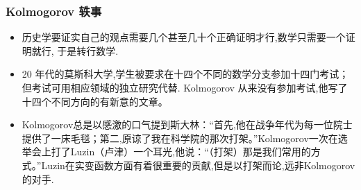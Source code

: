 \begin{frame}
  \frametitle{{\rm Kolmogorov} 轶事}
  \begin{itemize}[<+-|alert@+>]
  \item  历史学要证实自己的观点需要几个甚至几十个正确证明才行,数学只需要一个证明就行, 于是转行数学.
  \item 20 年代的莫斯科大学,学生被要求在十四个不同的数学分支参加十四门考试；但考试可用相应领域的独立研究代替. {\rm Kolmogorov} 从来没有参加考试,他写了十四个不同方向的有新意的文章。
  \item {\rm Kolmogorov}总是以感激的口气提到斯大林：“首先,他在战争年代为每一位院士提供了一床毛毯；第二,原谅了我在科学院的那次打架。”{\rm Kolmogorov}一次在选举会上打了{\rm Luzin}（卢津）一个耳光,他说：“（打架）那是我们常用的方式。”{\rm Luzin}在实变函数方面有着很重要的贡献,但是以打架而论,远非{\rm Kolmogorov}的对手.
  \end{itemize}
\end{frame}


